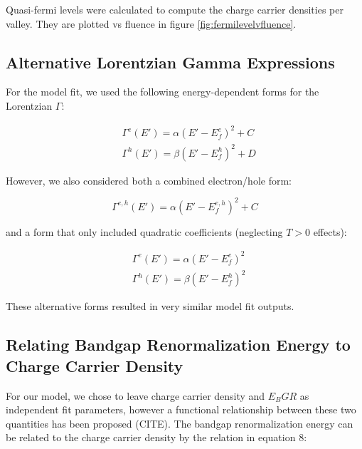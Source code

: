\documentclass[aps,prl,preprint,superscriptaddress]{revtex4-2}
\begin{document}
Quasi-fermi levels were calculated to compute the charge carrier densities per valley. They are plotted vs fluence in figure \ref{fig:fermilevelvfluence}.

\subsection{Alternative Lorentzian Gamma Expressions}

For the model fit, we used the following energy-dependent forms for the Lorentzian $\Gamma$:

\begin{equation} \label{Gamma factor alternative 1}
	\begin{aligned}
	&\Gamma^{e}(E') = \alpha(E' - E_f^{e})^2 + C \\
	&\Gamma^{h}(E') = \beta(E' - E_f^{h})^2 + D
	\end{aligned}
\end{equation}

However, we also considered both a combined electron/hole form:

\begin{equation} \label{Gamma factor alternative 2}
\Gamma^{e,h}(E') = \alpha(E' - E_f^{e,h})^2 + C
\end{equation}

and a form that only included quadratic coefficients (neglecting $T > 0$ effects):

\begin{equation} \label{Gamma factor alternative 3}
	\begin{aligned}
	&\Gamma^{e}(E') = \alpha(E' - E_f^{e})^2 \\
	&\Gamma^{h}(E') = \beta(E' - E_f^{h})^2
	\end{aligned}
\end{equation}

These alternative forms resulted in very similar model fit outputs.


\subsection{Relating Bandgap Renormalization Energy to Charge Carrier Density}

For our model, we chose to leave charge carrier density and $E_BGR$ as independent fit parameters, however a functional relationship between these two quantities has been proposed (CITE). The bandgap renormalization energy can be related to the charge carrier density by the relation in equation 8:
\end{document}
